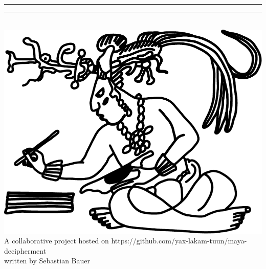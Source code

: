\documentclass[../main.tex]{subfiles}
\begin{document}
\begin{center}
	\noindent\rule[1ex]{\textwidth}{1pt}
	\Large{\textsf{\worktitle}}
	\noindent\rule[1ex]{\textwidth}{1pt}
	\vspace{2em}	
	\\
	\includegraphics[keepaspectratio]{img/scriber}
	\\
	A collaborative project hosted on
	https://github.com/yax-lakam-tuun/maya-decipherment\\
	written by Sebastian Bauer
	\vspace{2em}
	\\
\end{center}
\begin{flushright}
	\documentversionlongcount \documentversiontzolkin \documentversionhaab
	\\
	\documentversiongregoriandate{}
\end{flushright}

\clearpage 
\thispagestyle{empty}
\section*{}

\end{document}
